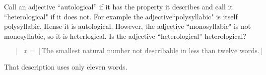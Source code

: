 \begin{example}
Call an adjective ``autological'' if it has the property it describes and call it ``heterological" if it does not. For example the adjective``polysyllabic" is itself polysyllabic, Hense it is autological.  However, the adjective ``monosyllabic" is not monosyllabic, so it is heterlogical.  Is the adjective ``heterological'' heterological?
\end{example}

\begin{example}
\begin{quotation}
$$x = [\textrm{The smallest natural number not describable in less than twelve words.}]$$
\end{quotation}
That description uses only eleven words.  

\end{example}

